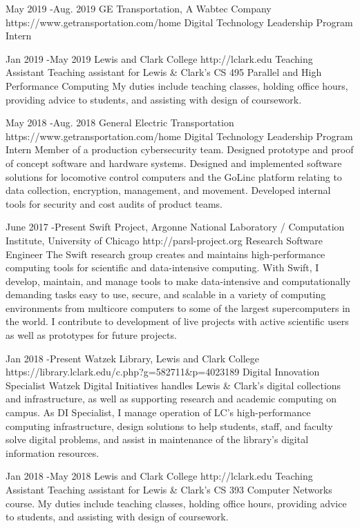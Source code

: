 \documentclass[10pt]{article} %
\begin{document}
\job
{May 2019 -}{Aug. 2019}
{GE Transportation, A Wabtec Company}
{https://www.getransportation.com/home}
{Digital Technology Leadership Program Intern}
{}


\job
{Jan 2019 -}{May 2019}
{Lewis and Clark College}
{http://lclark.edu}
{Teaching Assistant}
{Teaching assistant for Lewis \& Clark's CS 495 Parallel and High Performance Computing My duties include teaching classes, holding office hours, providing advice to students, and assisting with design of coursework.}


\job
{May 2018 -}{Aug. 2018}
{General Electric Transportation}
{https://www.getransportation.com/home}
{Digital Technology Leadership Program Intern}
{Member of a production cybersecurity team. Designed prototype and proof of concept software and hardware systems. Designed and implemented software solutions for locomotive control computers and the GoLinc platform relating to data collection, encryption, management, and movement. Developed internal tools for security and cost audits of product teams.}

\job
{June 2017 -}{Present}
{Swift Project, Argonne National Laboratory / Computation Institute, University of Chicago}
{http://parsl-project.org}
{Research Software Engineer}
{The Swift research group creates and maintains high-performance computing tools for scientific and data-intensive computing. With Swift, I develop, maintain, and manage tools to make data-intensive and computationally demanding tasks easy to use, secure, and scalable in a variety of computing environments from multicore computers to some of the largest supercomputers in the world. I contribute to development of live projects with active scientific users as well as prototypes for future projects.}


\job
{Jan 2018 -}{Present}
{Watzek Library, Lewis and Clark College}
{https://library.lclark.edu/c.php?g=582711\&p=4023189}
{Digital Innovation Specialist}
{Watzek Digital Initiatives handles Lewis \& Clark's digital collections and infrastructure, as well as supporting research and academic computing on campus. As DI Specialist, I manage operation of LC's high-performance computing infrastructure, design solutions to help students, staff, and faculty solve digital problems, and assist in maintenance of the library's digital information resources.}


\job
{Jan 2018 -}{May 2018}
{Lewis and Clark College}
{http://lclark.edu}
{Teaching Assistant}
{Teaching assistant for Lewis \& Clark's CS 393 Computer Networks course. My duties include teaching classes, holding office hours, providing advice to students, and assisting with design of coursework.}
\end{document}
